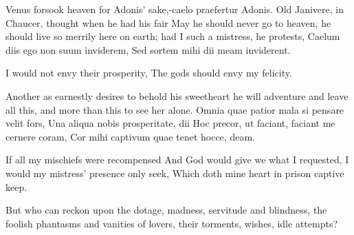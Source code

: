 {Venus forsook heaven for Adonis' sake,-caelo praefertur Adonis.
Old Janivere, in Chaucer, thought when he had his fair May he should
never go to heaven, he should live so merrily here on earth; had I such
a mistress, he protests,
Caelum diis ego non suum inviderem,
Sed sortem mihi dii meam inviderent.

I would not envy their prosperity,
The gods should envy my felicity.

Another as earnestly desires to behold his sweetheart he will adventure
and leave all this, and more than this to see her alone.
Omnia quae patior mala si pensare velit fors,
Una aliqua nobis prosperitate, dii
Hoc precor, ut faciant, faciant me cernere coram,
Cor mihi captivum quae tenet hocce, deam.

If all my mischiefs were recompensed
And God would give we what I requested,
I would my mistress' presence only seek,
Which doth mine heart in prison captive keep.

But who can reckon upon the dotage, madness, servitude and blindness,
the foolish phantasms and vanities of lovers, their torments, wishes,
idle attempts?

}
